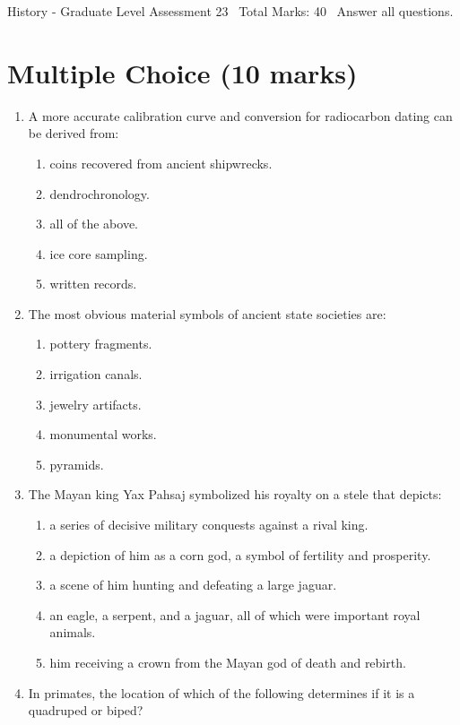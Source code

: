 \documentclass[12pt]{article}
\begin{document}
\begin{center}
History - Graduate Level Assessment 23 \
Total Marks: 40 \
Answer all questions.
\end{center}

\section*{Multiple Choice (10 marks)}
\begin{enumerate}[label=\arabic*.]
\item A more accurate calibration curve and conversion for radiocarbon dating can be derived from:
\begin{enumerate}[label=(\alph*)]
    \item coins recovered from ancient shipwrecks.
    \item dendrochronology.
    \item all of the above.
    \item ice core sampling.
    \item written records.
\end{enumerate}
\item The most obvious material symbols of ancient state societies are:
\begin{enumerate}[label=(\alph*)]
    \item pottery fragments.
    \item irrigation canals.
    \item jewelry artifacts.
    \item monumental works.
    \item pyramids.
\end{enumerate}
\item The Mayan king Yax Pahsaj symbolized his royalty on a stele that depicts:
\begin{enumerate}[label=(\alph*)]
    \item a series of decisive military conquests against a rival king.
    \item a depiction of him as a corn god, a symbol of fertility and prosperity.
    \item a scene of him hunting and defeating a large jaguar.
    \item an eagle, a serpent, and a jaguar, all of which were important royal animals.
    \item him receiving a crown from the Mayan god of death and rebirth.
\end{enumerate}
\item In primates, the location of which of the following determines if it is a quadruped or biped?

\end{enumerate}
\end{document}
